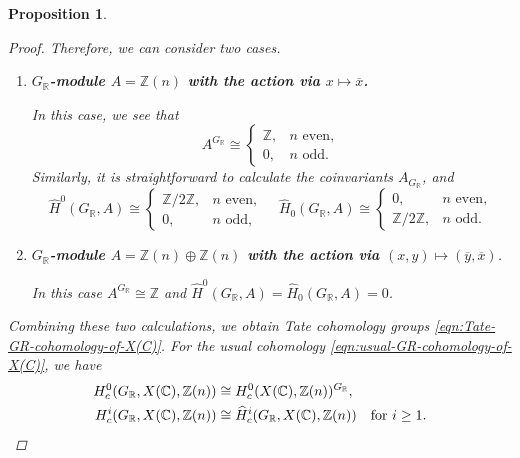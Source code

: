\documentclass[draft]{article}
\newcommand{\CC}{\mathbb{C}}
\newcommand{\RR}{\mathbb{R}}
\newcommand{\ZZ}{\mathbb{Z}}
\theoremstyle{myplain}
\newtheorem{proposition}[theorem]{Proposition}
\theoremstyle{mydefinition}
\begin{document}
\begin{proposition}
\begin{proof}
    \vspace{1em}

    Therefore, we can consider two cases.
    \begin{enumerate}
    \item[1)] \textbf{$G_\RR$-module $A = \ZZ (n)$ with the action via
        $x \mapsto \overline{x}$.}

      In this case, we see that
      \[ A^{G_\RR} \cong
        \begin{cases}
          \ZZ, & n\text{ even}, \\
          0, & n\text{ odd}.
        \end{cases} \]
      Similarly, it is straightforward to calculate the coinvariants
      $A_{G_\RR}$, and
      \[ \widehat{H}^0 (G_\RR, A) \cong
        \begin{cases}
          \ZZ/2\ZZ, & n\text{ even},\\
          0, & n\text{ odd},
        \end{cases} \quad
        \widehat{H}_0 (G_\RR, A) \cong
        \begin{cases}
          0, & n\text{ even},\\
          \ZZ/2\ZZ, & n\text{ odd}.
        \end{cases} \]

    \item[2)] \textbf{$G_\RR$-module $A = \ZZ (n) \oplus \ZZ (n)$ with the
        action via $(x,y) \mapsto (\overline{y}, \overline{x})$}.

      In this case $A^{G_\RR} \cong \ZZ$ and
      $\widehat{H}^0 (G_\RR,A) = \widehat{H}_0 (G_\RR,A) = 0$.
    \end{enumerate}

    Combining these two calculations, we obtain Tate cohomology groups
    \eqref{eqn:Tate-GR-cohomology-of-X(C)}. For the usual cohomology
    \eqref{eqn:usual-GR-cohomology-of-X(C)}, we have
    \begin{align*}
      H^0_c (G_\RR, X(\CC), \ZZ (n)) & \cong H^0_c (X(\CC), \ZZ (n))^{G_\RR}, \\
      H^i_c (G_\RR, X(\CC), \ZZ (n)) & \cong \widehat{H}^i_c (G_\RR, X(\CC), \ZZ (n)) \quad \text{for }i \ge 1. \qedhere
    \end{align*}
  \end{proof}
\end{proposition}

\end{document}
